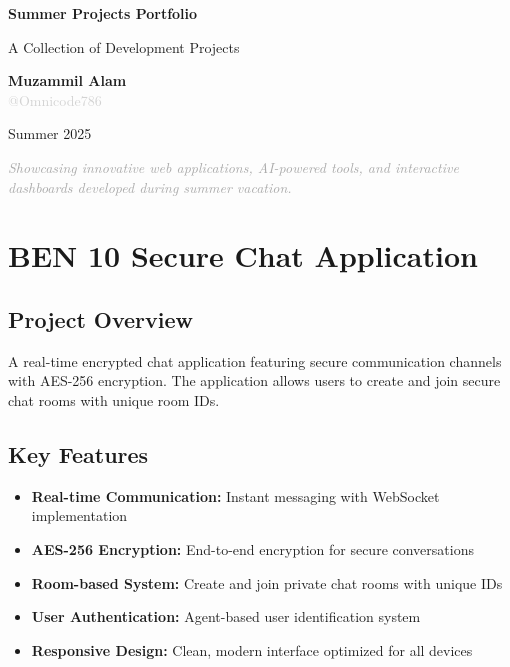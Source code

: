 \documentclass[11pt,a4paper]{article}
\begin{document}
\begin{titlepage}
\centering
\vspace*{2cm}

{\Huge\bfseries\color{primaryblue} Summer Projects Portfolio}

\vspace{1cm}

{\Large\color{darkgray} A Collection of Development Projects}

\vspace{1.5cm}

{\large\textbf{Muzammil Alam}}\\
\vspace{0.5cm}
{\textcolor{lightgray}{@Omnicode786}}

\vspace{2cm}

{\large Summer 2025}

\vspace{3cm}

\textcolor{darkgray}{\textit{Showcasing innovative web applications, AI-powered tools, and interactive dashboards developed during summer vacation.}}

\end{titlepage}

\newpage

\section{BEN 10 Secure Chat Application}

\subsection{Project Overview}
A real-time encrypted chat application featuring secure communication channels with AES-256 encryption. The application allows users to create and join secure chat rooms with unique room IDs.

\subsection{Key Features}
\begin{itemize}[leftmargin=1.5cm]
\item \textbf{Real-time Communication:} Instant messaging with WebSocket implementation
\item \textbf{AES-256 Encryption:} End-to-end encryption for secure conversations
\item \textbf{Room-based System:} Create and join private chat rooms with unique IDs
\item \textbf{User Authentication:} Agent-based user identification system
\item \textbf{Responsive Design:} Clean, modern interface optimized for all devices
\end{itemize}
\end{document}
